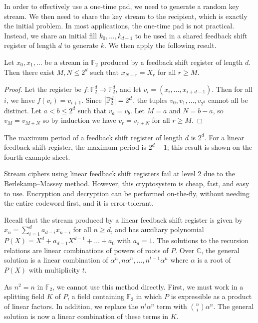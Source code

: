 In order to effectively use a one-time pad, we need to generate a random key stream.
We then need to share the key stream to the recipient, which is exactly the initial problem.
In most applications, the one-time pad is not practical.
Instead, we share an initial fill \( k_0, \dots, k_{d-1} \) to be used in a shared feedback shift register of length \( d \) to generate \( k \).
We then apply the following result.
\begin{lemma}
    Let \( x_0, x_1, \dots \) be a stream in \( \mathbb F_2 \) produced by a feedback shift register of length \( d \).
    Then there exist \( M, N \leq 2^d \) such that \( x_{N+r} = X_{r} \) for all \( r \geq M \).
\end{lemma}
\begin{proof}
    Let the register be \( f \colon \mathbb F_2^d \to \mathbb F_2^d \), and let \( v_i = (x_i, \dots, x_{i+d-1}) \).
    Then for all \( i \), we have \( f(v_i) = v_{i+1} \).
    Since \( \abs{\mathbb F_2^d} = 2^d \), the tuples \( v_0, v_1, \dots, v_{2^d} \) cannot all be distinct.
    Let \( a < b \leq 2^d \) such that \( v_a = v_b \).
    Let \( M = a \) and \( N = b - a \), so \( v_M = v_{M+N} \) so by induction we have \( v_r = v_{r+N} \) for all \( r \geq M \).
\end{proof}
\begin{remark}
    The maximum period of a feedback shift register of length \( d \) is \( 2^d \).
    For a linear feedback shift register, the maximum period is \( 2^d - 1 \); this result is shown on the fourth example sheet.
    
    Stream ciphers using linear feedback shift registers fail at level 2 due to the Berlekamp--Massey method.
    However, this cryptosystem is cheap, fast, and easy to use.
    Encryption and decryption can be performed on-the-fly, without needing the entire codeword first, and it is error-tolerant.
\end{remark}
Recall that the stream produced by a linear feedback shift register is given by \( x_n = \sum_{i=1}^d a_{d-i} x_{n-i} \) for all \( n \geq d \), and has auxiliary polynomial \( P(X) = X^d + a_{d-1}X^{d-1} + \dots + a_0 \) with \( a_d = 1 \).
The solutions to the recursion relations are linear combinations of powers of roots of \( P \).
Over \( \mathbb C \), the general solution is a linear combination of \( \alpha^n, n\alpha^n, \dots, n^{t-1} \alpha^n \) where \( \alpha \) is a root of \( P(X) \) with multiplicity \( t \).

As \( n^2 = n \) in \( \mathbb F_2 \), we cannot use this method directly.
First, we must work in a splitting field \( K \) of \( P \), a field containing \( \mathbb F_2 \) in which \( P \) is expressible as a product of linear factors.
In addition, we replace the \( n^i \alpha^n \) term with \( \binom{n}{i} \alpha^n \).
The general solution is now a linear combination of these terms in \( K \).

